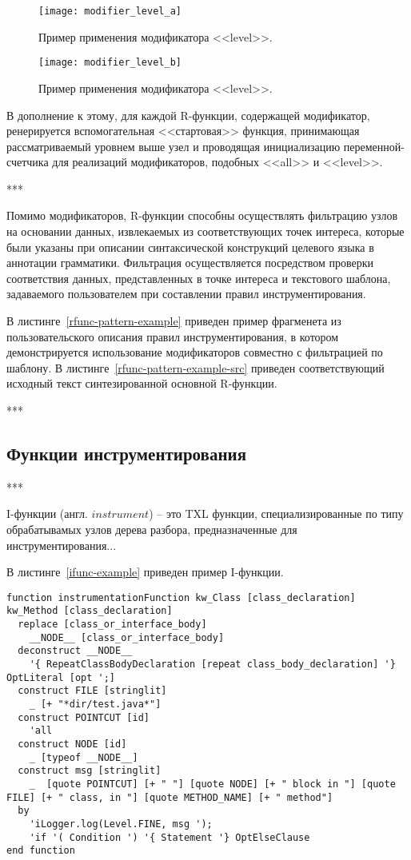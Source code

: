 \begin{figure}[!h]
	\centering
	\texttt{[image: modifier\_level\_a]}
	\caption{Пример применения модификатора <<level>>.}
	\label{fig:modifier_level_a}
\end{figure}

\begin{figure}[!h]
	\centering
	\texttt{[image: modifier\_level\_b]}
	\caption{Пример применения модификатора <<level>>.}
	\label{fig:modifier_level_b}
\end{figure}

В дополнение к этому, для каждой R-функции, содержащей модификатор, ренерируется вспомогательная <<стартовая>> функция, принимающая рассматриваемый уровнем выше узел и проводящая инициализацию переменной-счетчика для реализаций модификаторов, подобных <<all>> и <<level>>.

***

Помимо модификаторов, R-функции способны осуществлять фильтрацию узлов на основании данных, извлекаемых из соответствующих точек интереса, которые были указаны при описании синтаксической конструкций целевого языка в аннотации грамматики.
Фильтрация осуществляется посредством проверки соответствия данных, представленных в точке интереса и текстового шаблона, задаваемого пользователем при составлении правил инструментирования.

В листинге~\ref{rfunc-pattern-example} приведен пример фрагменета из пользовательского описания правил инструментирования, в котором демонстрируется использование модификаторов совместно с фильтрацией по шаблону.
В листинге~\ref{rfunc-pattern-example-src} приведен соответствующий исходный текст синтезированной основной R-функции.

***

\subsection{Функции инструментирования}

***

I-функции (англ. $instrument$) -- это TXL функции, специализированные по типу обрабатывамых узлов дерева разбора, предназначенные для инструментирования...

В листинге~\ref{ifunc-example} приведен пример I-функции.

\begin{lstlisting}[frame=single, language=TXL, label={ifunc-example}, caption={Пример I-функции}]
function instrumentationFunction kw_Class [class_declaration] kw_Method [class_declaration]
  replace [class_or_interface_body]
    __NODE__ [class_or_interface_body]
  deconstruct __NODE__
    '{ RepeatClassBodyDeclaration [repeat class_body_declaration] '} OptLiteral [opt ';]
  construct FILE [stringlit]
    _ [+ "*dir/test.java*"]
  construct POINTCUT [id]
    'all
  construct NODE [id]
    _ [typeof __NODE__]
  construct msg [stringlit]
    _  [quote POINTCUT] [+ " "] [quote NODE] [+ " block in "] [quote FILE] [+ " class, in "] [quote METHOD_NAME] [+ " method"]
  by
    'iLogger.log(Level.FINE, msg ');
    'if '( Condition ') '{ Statement '} OptElseClause
end function
\end{lstlisting}

